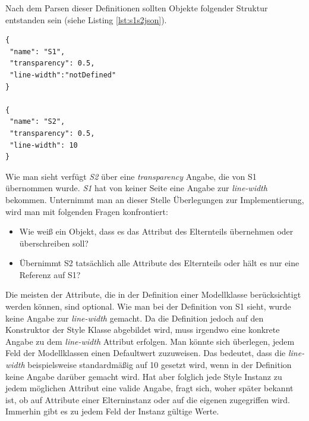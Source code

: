 Nach dem Parsen dieser Definitionen sollten Objekte folgender Struktur entstanden sein (siehe Listing \ref{lst:s1s2json}).
\begin{lstlisting}[style=spray, caption = {\textit{S1} und \textit{S2} Objekte (aus Gründen der Lesbarkeit aufgeführt in der \textit{Java Script Object Notation})}, label = {lst:s1s2json}]
{
 "name": "S1",
 "transparency": 0.5,
 "line-width":"notDefined"
}

{
 "name": "S2",
 "transparency": 0.5,
 "line-width": 10
}
\end{lstlisting}Wie man sieht verfügt \textit{S2} über eine \textit{transparency} Angabe, die von S1 übernommen wurde. \textit{S1} hat von keiner Seite eine Angabe zur \textit{line-width} bekommen. Unternimmt man an dieser Stelle Überlegungen zur Implementierung, wird man mit folgenden Fragen konfrontiert:
\begin{itemize}
\item Wie weiß ein Objekt, dass es das Attribut des Elternteils übernehmen oder überschreiben soll?
\item Übernimmt S2 tatsächlich alle Attribute des Elternteils oder hält es nur eine Referenz auf S1?
\end{itemize}Die meisten der Attribute, die in der Definition einer Modellklasse berücksichtigt werden können, sind optional. Wie man bei der Definition von S1 sieht, wurde keine Angabe zur \textit{line-width} gemacht. Da die Definition jedoch auf den Konstruktor der Style Klasse abgebildet wird, muss irgendwo eine konkrete Angabe zu dem \textit{line-width} Attribut erfolgen. Man könnte sich überlegen, jedem Feld der Modellklassen einen Defaultwert zuzuweisen. Das bedeutet, dass die \textit{line-width} beispielsweise standardmäßig auf 10 gesetzt wird, wenn in der Definition keine Angabe darüber gemacht wird. Hat aber folglich jede Style Instanz zu jedem möglichen Attribut eine valide Angabe, fragt sich, woher später bekannt ist, ob auf Attribute einer Elterninstanz oder auf die eigenen zugegriffen wird. Immerhin gibt es zu jedem Feld der Instanz gültige Werte.
